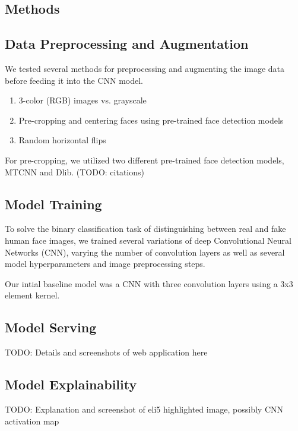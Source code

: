 \documentclass[11pt, letterpaper]{article}
\begin{document}
\begin{multicols}{2}
  \section{Methods}

  \subsection{Data Preprocessing and Augmentation}

  We tested several methods for preprocessing and augmenting the image data
  before feeding it into the CNN model.

  \begin{enumerate}
  \item 3-color (RGB) images vs. grayscale
  \item Pre-cropping and centering faces using pre-trained face detection models
  \item Random horizontal flips
  \end{enumerate}

  For pre-cropping, we utilized two different pre-trained face detection models,
  MTCNN and Dlib. (TODO: citations)

  \subsection{Model Training}

  To solve the binary classification task of distinguishing between real and
  fake human face images, we trained several variations of deep Convolutional
  Neural Networks (CNN), varying the number of convolution layers as well as
  several model hyperparameters and image preprocessing steps.

  Our intial baseline model was a CNN with three convolution layers using a 3x3
  element kernel.

  \subsection{Model Serving}

  TODO: Details and screenshots of web application here

  \subsection{Model Explainability}

  TODO: Explanation and screenshot of eli5 highlighted image, possibly CNN
  activation map


\end{multicols}
\end{document}
